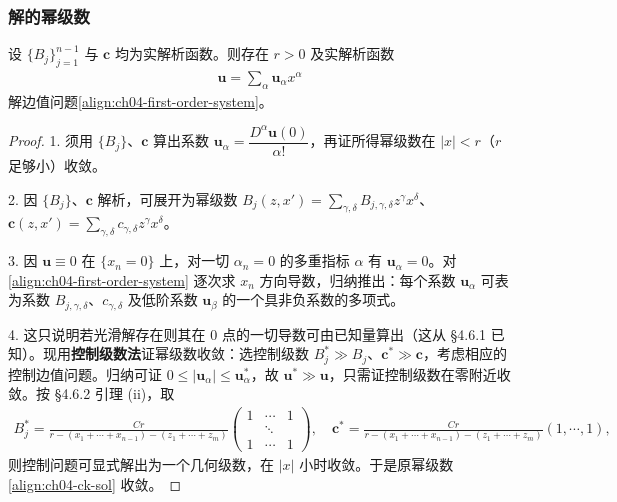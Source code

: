 \documentclass[../../main.tex]{subfiles}
\begin{document}
\subsubsection{解的幂级数}

\begin{theorem}\label{theorem:ch04-ck}设 $\{B_j\}_{j=1}^{n-1}$ 与 $\mathbf{c}$ 均为实解析函数。则存在 $r>0$ 及实解析函数
\begin{align}\label{align:ch04-ck-sol}
\mathbf{u}=\sum_\alpha\mathbf{u}_\alpha x^\alpha
\end{align}
解边值问题\eqref{align:ch04-first-order-system}。
\end{theorem}

\begin{proof}
1. 须用 $\{B_j\}$、$\mathbf{c}$ 算出系数 $\mathbf{u}_\alpha=\dfrac{D^\alpha\mathbf{u}(0)}{\alpha!}$，再证所得幂级数在 $|x|<r$（$r$ 足够小）收敛。

2. 因 $\{B_j\}$、$\mathbf{c}$ 解析，可展开为幂级数 $B_j(z,x')=\sum_{\gamma,\delta}B_{j,\gamma,\delta}z^\gamma x^\delta$、$\mathbf{c}(z,x')=\sum_{\gamma,\delta}c_{\gamma,\delta}z^\gamma x^\delta$。

3. 因 $\mathbf{u}\equiv 0$ 在 $\{x_n=0\}$ 上，对一切 $\alpha_n=0$ 的多重指标 $\alpha$ 有 $\mathbf{u}_\alpha=0$。对\eqref{align:ch04-first-order-system} 逐次求 $x_n$ 方向导数，归纳推出：每个系数 $\mathbf{u}_\alpha$ 可表为系数 $B_{j,\gamma,\delta}$、$c_{\gamma,\delta}$ 及低阶系数 $\mathbf{u}_\beta$ 的一个具非负系数的多项式。

4. 这只说明若光滑解存在则其在 $0$ 点的一切导数可由已知量算出（这从 \S4.6.1 已知）。现用\textbf{控制级数法}证幂级数收敛：选控制级数 $B_j^*\gg B_j$、$\mathbf{c}^*\gg\mathbf{c}$，考虑相应的控制边值问题。归纳可证 $0\leqslant|\mathbf{u}_\alpha|\leqslant\mathbf{u}_\alpha^*$，故 $\mathbf{u}^*\gg\mathbf{u}$，只需证控制级数在零附近收敛。按 \S4.6.2 引理 (ii)，取
\begin{align*}
B_j^*=\frac{Cr}{r-(x_1+\cdots+x_{n-1})-(z_1+\cdots+z_m)}\begin{pmatrix}1&\cdots&1\\ &\ddots&\\1&\cdots&1\end{pmatrix},\quad \mathbf{c}^*=\frac{Cr}{r-(x_1+\cdots+x_{n-1})-(z_1+\cdots+z_m)}(1,\cdots,1),
\end{align*}
则控制问题可显式解出为一个几何级数，在 $|x|$ 小时收敛。于是原幂级数\eqref{align:ch04-ck-sol} 收敛。
\end{proof}
\end{document}
